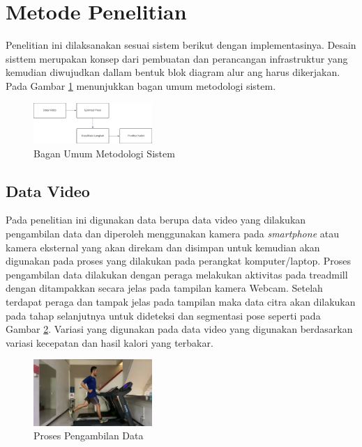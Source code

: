 \section{Metode Penelitian}
\label{sec:MetodePenelitian}

Penelitian ini dilaksanakan sesuai sistem berikut dengan implementasinya. Desain sisttem merupakan konsep dari pembuatan dan perancangan infrastruktur yang kemudian diwujudkan dallam bentuk blok diagram alur ang harus dikerjakan. Pada Gambar \ref{fig:BlokMetodologi} menunjukkan bagan umum metodologi sistem.

\begin{figure} [ht]
  \centering
  \includegraphics[width=0.4\textwidth]{gambar/blok diagram metodologi4.png}
  \caption{Bagan Umum Metodologi Sistem}
  \label{fig:BlokMetodologi}
\end{figure}

\subsection{Data Video}
\label{subsec:DataVideo}

Pada penelitian ini digunakan data berupa data video yang dilakukan pengambilan data dan diperoleh menggunakan kamera pada \emph{smartphone} atau kamera eksternal yang akan direkam dan disimpan untuk kemudian akan digunakan pada proses yang dilakukan pada perangkat komputer/laptop. Proses pengambilan data dilakukan dengan peraga melakukan aktivitas pada treadmill dengan ditampakkan secara jelas pada tampilan kamera Webcam. Setelah terdapat peraga dan tampak jelas pada tampilan maka data citra akan dilakukan pada tahap selanjutnya untuk dideteksi dan segmentasi pose seperti pada Gambar \ref{fig:DataVideo}. Variasi yang digunakan pada data video yang digunakan berdasarkan variasi kecepatan dan hasil kalori yang terbakar.

\begin{figure} [ht]
  \centering
  \includegraphics[width=0.4\textwidth]{gambar/pengambilan data.png}
  \caption{Proses Pengambilan Data}
  \label{fig:DataVideo}
\end{figure}

